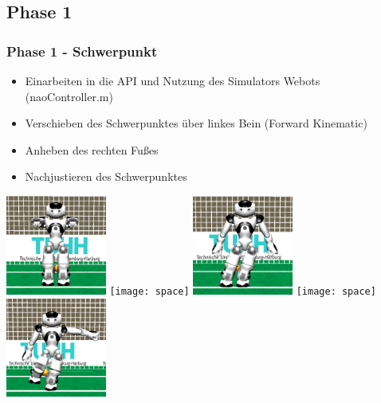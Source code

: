 \documentclass[]{beamer}
\begin{document}
\subsection{Phase 1}
\begin{frame}
	\frametitle{Phase 1 - Schwerpunkt}
	\begin{itemize}
		\item Einarbeiten in die API und Nutzung des Simulators Webots (naoController.m)
		\item Verschieben des Schwerpunktes über linkes Bein (Forward Kinematic)
		\item Anheben des rechten Fußes
		\item Nachjustieren des Schwerpunktes	
	\end{itemize}
	\includegraphics[width=3.3cm]{nao1}
	\texttt{[image: space]}
	\includegraphics[width=3.3cm]{nao2}
	\texttt{[image: space]}
	\includegraphics[width=3.3cm]{nao3}
\end{frame}
\end{document}
